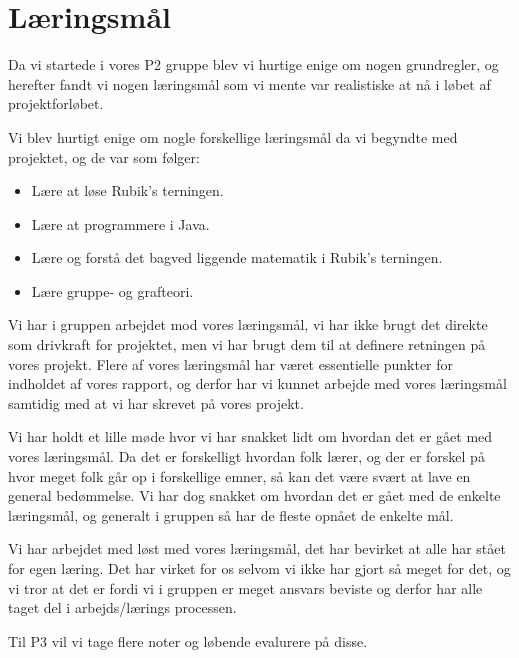 \section{L\ae{}ringsm\aa{}l}
Da vi startede i vores P2 gruppe blev vi hurtige enige om nogen grundregler, og herefter fandt vi nogen l\ae{}ringsm\aa{}l som vi mente var realistiske at n\aa{} i l\o{}bet af projektforl\o{}bet.

Vi blev hurtigt enige om nogle forskellige l\ae{}ringsm\aa{}l da vi begyndte med projektet, og de var som f\o{}lger:

\begin{itemize}
\item L\ae{}re at l\o{}se Rubik's terningen.
\item L\ae{}re at programmere i Java.
\item L\ae{}re  og forst\aa{} det bagved liggende matematik i Rubik's terningen. 
\item L\ae{}re gruppe- og grafteori.
\end{itemize}

Vi har i gruppen arbejdet mod vores l\ae{}ringsm\aa{}l, vi har ikke brugt det direkte som drivkraft for projektet, men vi har brugt dem til at definere retningen p\aa{} vores projekt.
Flere af vores l\ae{}ringsm\aa{}l har v\ae{}ret essentielle punkter for indholdet af vores rapport, og derfor har vi kunnet arbejde med vores l\ae{}ringsm\aa{}l samtidig med at vi har skrevet p\aa{} vores projekt.

Vi har holdt et lille m\o{}de hvor vi har snakket lidt om hvordan det er g\aa{}et med vores l\ae{}ringsm\aa{}l. Da det er forskelligt hvordan folk l\ae{}rer, og der er forskel p\aa{} hvor meget folk g\aa{}r op i forskellige emner, s\aa{} kan det v\ae{}re sv\ae{}rt at lave en general bed\o{}mmelse. Vi har dog snakket om hvordan det er g\aa{}et med de enkelte l\ae{}ringsm\aa{}l, og generalt i gruppen s\aa{} har de fleste opn\aa{}et de enkelte m\aa{}l.

Vi har arbejdet med l\o{}st med vores l\ae{}ringsm\aa{}l, det har bevirket at alle har st\aa{}et for egen l\ae{}ring. Det har virket for os selvom vi ikke har gjort s\aa{} meget for det, og vi tror at det er fordi vi i gruppen er meget ansvars beviste og derfor har alle taget del i arbejds/l\ae{}rings processen.

Til P3 vil vi tage flere noter og l\o{}bende evalurere p\aa{} disse.

